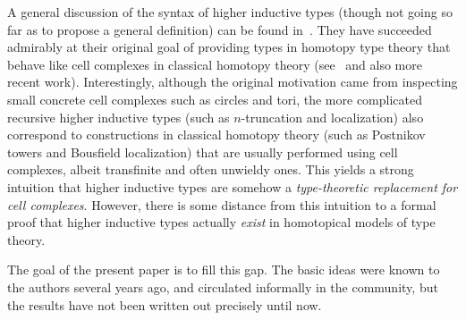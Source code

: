 A general discussion of the syntax of higher inductive types (though not going so far as to propose a general definition) can be found in~\cite[Chapter 6]{hottbook}.
They have succeeded admirably at their original goal of providing types in homotopy type theory that behave like cell complexes in classical homotopy theory (see~\cite[Chapter 8]{hottbook} and also more recent work).
Interestingly, although the original motivation came from inspecting small concrete cell complexes such as circles and tori, the more complicated recursive higher inductive types (such as $n$-truncation and localization) also correspond to constructions in classical homotopy theory (such as Postnikov towers and Bousfield localization) that are usually performed using cell complexes, albeit transfinite and often unwieldy ones.
This yields a strong intuition that higher inductive types are somehow a \emph{type-theoretic replacement for cell complexes}.
However, there is some distance from this intuition to a formal proof that higher inductive types actually \emph{exist} in homotopical models of type theory.

The goal of the present paper is to fill this gap.
The basic ideas were known to the authors several years ago, and circulated informally in the community, but the results have not been written out precisely until now.


